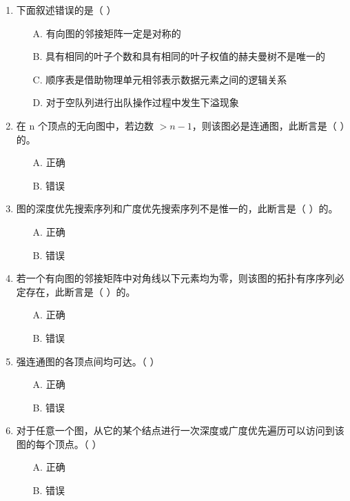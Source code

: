\documentclass[12pt, a4paper]{article}
\begin{document}
\begin{enumerate}[label=\arabic*.]
	\item 下面叙述错误的是（ ）
	      \begin{enumerate}
		      \item[A.] 有向图的邻接矩阵一定是对称的
		      \item[B.] 具有相同的叶子个数和具有相同的叶子权值的赫夫曼树不是唯一的
		      \item[C.] 顺序表是借助物理单元相邻表示数据元素之间的逻辑关系
		      \item[D.] 对于空队列进行出队操作过程中发生下溢现象
	      \end{enumerate}

	\item 在 n 个顶点的无向图中，若边数 $>n-1$，则该图必是连通图，此断言是（ ）的。
	      \begin{enumerate}
		      \item[A.] 正确
		      \item[B.] 错误
	      \end{enumerate}

	\item 图的深度优先搜索序列和广度优先搜索序列不是惟一的，此断言是（ ）的。
	      \begin{enumerate}
		      \item[A.] 正确
		      \item[B.] 错误
	      \end{enumerate}

	\item 若一个有向图的邻接矩阵中对角线以下元素均为零，则该图的拓扑有序序列必定存在，此断言是（ ）的。
	      \begin{enumerate}
		      \item[A.] 正确
		      \item[B.] 错误
	      \end{enumerate}

	\item 强连通图的各顶点间均可达。（ ）
	      \begin{enumerate}
		      \item[A.] 正确
		      \item[B.] 错误
	      \end{enumerate}

	\item 对于任意一个图，从它的某个结点进行一次深度或广度优先遍历可以访问到该图的每个顶点。（ ）
	      \begin{enumerate}
		      \item[A.] 正确
		      \item[B.] 错误
	      \end{enumerate}


\end{enumerate}
\end{document}
